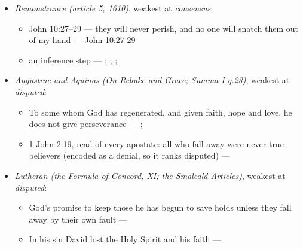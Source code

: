 \documentclass[11pt]{article}
\begin{document}
\begin{itemize}
\begin{itemize}
\item God’s promise to keep those he has begun to save holds unless they fall away by their own fault --- \cite[Trent, Session VI (1547), ch. 13]{tanner-decrees-1990}; \cite[40]{waterworth-trent-1848}
\item Justifying grace, once given, can be lost --- \cite[Trent, Session VI (1547), ch. 15]{tanner-decrees-1990}; \cite[42]{waterworth-trent-1848}; \cite[Trent, Session VI (1547), canon 23]{tanner-decrees-1990}; \cite[47]{waterworth-trent-1848}
\item an inference step --- \cite[329--330]{calvin-corinthians-1-1848}; \cite[Trent, Session VI (1547), ch. 13]{tanner-decrees-1990}; \cite[40--41]{waterworth-trent-1848}
\end{itemize}
\item \emph{Remonstrance (article 5, 1610)}, weakest at \emph{consensus}:
\begin{itemize}
\item John 10:27–29 — they will never perish, and no one will snatch them out of my hand --- John 10:27-29
\item an inference step --- \cite[548--549]{schaff-creeds-christendom-3-1977}; \cite[603]{arminius-works-1-1825}; \cite[Solid Declaration XI.45]{concordia-triglotta-1921}; \cite[444--445]{wesley-works-9-1827}
\end{itemize}
\item \emph{Augustine and Aquinas (On Rebuke and Grace; Summa I q.23)}, weakest at \emph{disputed}:
\begin{itemize}
\item To some whom God has regenerated, and given faith, hope and love, he does not give perseverance --- \cite[478]{npnf1-05-1887}; \cite[On Rebuke and Grace, ch. 18]{npnf1-05-1887}
\item 1 John 2:19, read of every apostate: all who fall away were never true believers (encoded as a denial, so it ranks disputed) --- \cite[479--480]{npnf1-05-1887}
\end{itemize}
\item \emph{Lutheran (the Formula of Concord, XI; the Smalcald Articles)}, weakest at \emph{disputed}:
\begin{itemize}
\item God’s promise to keep those he has begun to save holds unless they fall away by their own fault --- \cite[Solid Declaration XI.42]{concordia-triglotta-1921}
\item In his sin David lost the Holy Spirit and his faith --- \cite[Smalcald Articles III.iii.43]{concordia-triglotta-1921}

\end{itemize}
\end{itemize}
\end{document}
